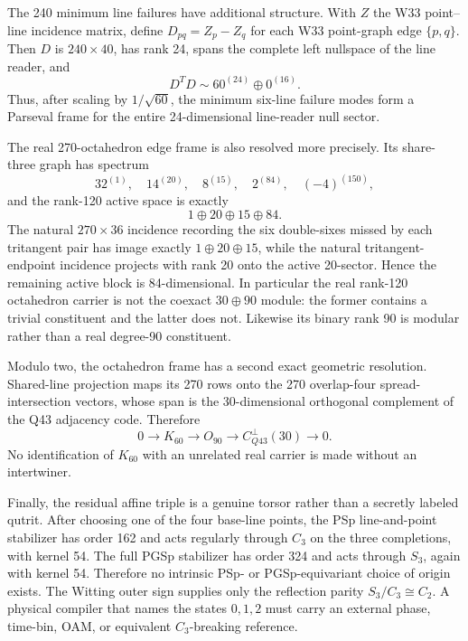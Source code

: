 The 240 minimum line failures have additional structure.  With $Z$ the W33 point--line incidence matrix, define $D_{pq}=Z_p-Z_q$ for each W33 point-graph edge $\{p,q\}$.  Then $D$ is $240\times40$, has rank 24, spans the complete left nullspace of the line reader, and
\[
D^TD\sim 60^{(24)}\oplus0^{(16)}.
\]
Thus, after scaling by $1/\sqrt{60}$, the minimum six-line failure modes form a Parseval frame for the entire 24-dimensional line-reader null sector.

The real 270-octahedron edge frame is also resolved more precisely.  Its share-three graph has spectrum
\[
32^{(1)},\quad14^{(20)},\quad8^{(15)},\quad2^{(84)},\quad(-4)^{(150)},
\]
and the rank-120 active space is exactly
\[
1\oplus20\oplus15\oplus84.
\]
The natural $270\times36$ incidence recording the six double-sixes missed by each tritangent pair has image exactly $1\oplus20\oplus15$, while the natural tritangent-endpoint incidence projects with rank 20 onto the active 20-sector.  Hence the remaining active block is 84-dimensional.  In particular the real rank-120 octahedron carrier is not the coexact $30\oplus90$ module: the former contains a trivial constituent and the latter does not.  Likewise its binary rank 90 is modular rather than a real degree-90 constituent.

Modulo two, the octahedron frame has a second exact geometric resolution.  Shared-line projection maps its 270 rows onto the 270 overlap-four spread-intersection vectors, whose span is the 30-dimensional orthogonal complement of the Q43 adjacency code.  Therefore
\[
0\longrightarrow K_{60}\longrightarrow O_{90}\longrightarrow C_{Q43}^{\perp}(30)\longrightarrow0.
\]
No identification of $K_{60}$ with an unrelated real carrier is made without an intertwiner.

Finally, the residual affine triple is a genuine torsor rather than a secretly labeled qutrit.  After choosing one of the four base-line points, the PSp line-and-point stabilizer has order 162 and acts regularly through $C_3$ on the three completions, with kernel 54.  The full PGSp stabilizer has order 324 and acts through $S_3$, again with kernel 54.  Therefore no intrinsic PSp- or PGSp-equivariant choice of origin exists.  The Witting outer sign supplies only the reflection parity $S_3/C_3\cong C_2$.  A physical compiler that names the states $0,1,2$ must carry an external phase, time-bin, OAM, or equivalent $C_3$-breaking reference.
